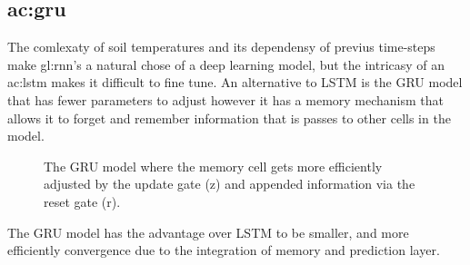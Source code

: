 \subsection{\acrfull{ac:gru}}

The comlexaty of soil temperatures and its dependensy of previus time-steps make \gls{gl:rnn}'s a natural chose of a deep learning model, but the intricasy of an \acrshort{ac:lstm} makes it difficult to fine tune. An alternative to LSTM is the GRU model\cite{cho_learning_2014} that has fewer parameters to adjust however it has a memory mechanism that allows it to forget and remember information that is passes to other cells in the model. 
\begin{figure}[H]
	\centering
	\caption[GRU model scetch]{The GRU model where the memory cell gets more efficiently adjusted by the update gate (z) and appended information via the reset gate (r).}
\end{figure}
The GRU model has the advantage over LSTM to be smaller, and more efficiently convergence due to the integration of memory and prediction layer.